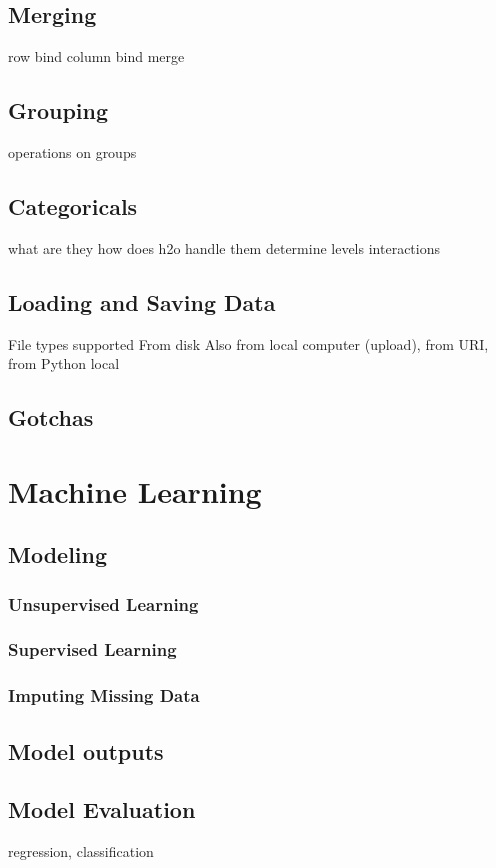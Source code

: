 \subsection{Merging}
row bind
column bind
merge

\subsection{Grouping}
operations on groups


\subsection{Categoricals}
what are they
how does h2o handle them
determine levels
interactions

\subsection{Loading and Saving Data}
File types supported
From disk
Also from local computer (upload), from URI, from Python local


\subsection{Gotchas}

\section{Machine Learning}

\subsection{Modeling}
\subsubsection{Unsupervised Learning}
\subsubsection{Supervised Learning}
\subsubsection{Imputing Missing Data}

\subsection{Model outputs}
\subsection{Model Evaluation}
regression, classification
